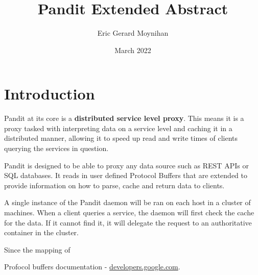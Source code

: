 \documentclass{article}
\title{Pandit Extended Abstract}
\author{Eric Gerard Moynihan}
\date{March 2022}
\begin{document}
\maketitle

\section{Introduction}
Pandit at its core is a \textbf{distributed service level proxy}.
This means it is a proxy tasked with interpreting data on a service level and caching it
in a distributed manner, allowing it to speed up read and write times of clients querying the services
in question.

Pandit is designed to be able to proxy any data source such as REST APIs or SQL databases.
It reads in user defined Protocol Buffers \cite{protobufs} that are extended to provide information on
how to parse, cache and return data to clients.

A single instance of the Pandit daemon will be ran on each host in a cluster of machines. When a client queries
a service, the daemon will first check the cache for the data. If it cannot find it, it will delegate the request
to an authoritative container in the cluster.

Since the mapping of



\begin{thebibliography}{9}
    Profocol buffers documentation - \href{https://developers.google.com/protocol-buffers}{developers.google.com}.
\end{thebibliography}
\end{document}

